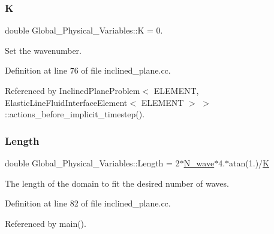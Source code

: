 \mbox{\label{namespaceGlobal__Physical__Variables_a9da8be10d9e20eb0329af7fd8d6e0e98}} 
\subsubsection{\texorpdfstring{K}{K}}
{\footnotesize\ttfamily double Global\+\_\+\+Physical\+\_\+\+Variables\+::K = 0.}



Set the wavenumber. 



Definition at line 76 of file inclined\+\_\+plane.\+cc.



Referenced by Inclined\+Plane\+Problem$<$ E\+L\+E\+M\+E\+N\+T, Elastic\+Line\+Fluid\+Interface\+Element$<$ E\+L\+E\+M\+E\+N\+T $>$ $>$\+::actions\+\_\+before\+\_\+implicit\+\_\+timestep().

\mbox{\label{namespaceGlobal__Physical__Variables_a987847160c3cfad8977836291fb9d0e0}} 
\subsubsection{\texorpdfstring{Length}{Length}}
{\footnotesize\ttfamily double Global\+\_\+\+Physical\+\_\+\+Variables\+::\+Length = 2$\ast$\hyperlink{namespaceGlobal__Physical__Variables_adf0e913323310713bf58ec469fb586e6}{N\+\_\+wave}$\ast$4.$\ast$atan(1.)/\hyperlink{namespaceGlobal__Physical__Variables_a9da8be10d9e20eb0329af7fd8d6e0e98}{K}}



The length of the domain to fit the desired number of waves. 



Definition at line 82 of file inclined\+\_\+plane.\+cc.



Referenced by main().

\mbox{\label{namespaceGlobal__Physical__Variables_adf0e913323310713bf58ec469fb586e6}} 
